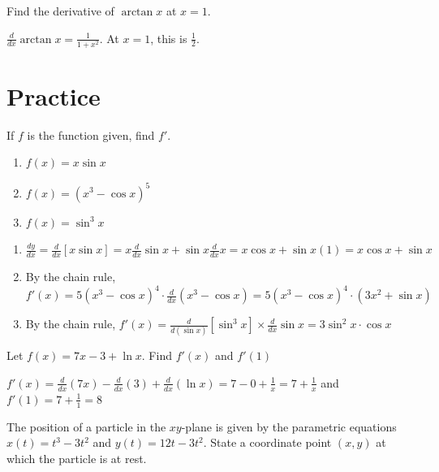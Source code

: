 \begin{Exercise}[title={Derivative of Arctangent}, label=itrig_deriv1]
Find the derivative of $\arctan x$ at $x = 1$.
\end{Exercise}
\begin{Answer}[ref=itrig_deriv1]
$\frac{d}{dx}\arctan x = \frac{1}{1 + x^2}$. At $x = 1$, this is $\frac{1}{2}$.
\end{Answer}

\section{Practice}
\begin{Exercise}[label=deriv_rules1]
If $f$ is the function given, find $f'$. 
	\begin{enumerate}
		\item$f(x) = x\sin{x}$
		\item$f(x)=(x^3-\cos{x})^5$
		\item$f(x) =\sin^3{x}$
	\end{enumerate}
\end{Exercise}

\begin{Answer}[ref=deriv_rules1]
	\begin{enumerate}
		\item $\frac{dy}{dx} = \frac{d}{dx}[x\sin{x}] = x\frac{d}{dx}\sin{x} 
		+ \sin{x}\frac{d}{dx}x = x\cos{x} + \sin{x}(1) = x\cos{x} + \sin{x}$
    	\item By the chain rule, $f'(x) = 5(x^3 - \cos{x})^4 \cdot 
    	\frac{d}{dx}(x^3 - \cos{x}) = 5(x^3 - \cos{x})^4 \cdot (3x^2 + 
    	\sin{x})$
    	\item By the chain rule, $f'(x) = \frac{d}{d(\sin{x})}[\sin^3{x}] 
    	\times \frac{d}{dx}\sin{x} = 3\sin^2{x} \cdot \cos{x}$
	\end{enumerate}
    
\end{Answer}

\begin{Exercise}[label=deriv_rules2]
    Let $f(x)=7x-3+\ln{x}$. Find $f'(x)$ and $f'(1)$
\end{Exercise}
\begin{Answer}[ref=deriv_rules2]
    $f'(x) = \frac{d}{dx}(7x) - \frac{d}{dx}(3) + \frac{d}{dx}(\ln{x})
    = 7 - 0 + \frac{1}{x} = 7 + \frac{1}{x}$
    and
    $f'(1) = 7 + \frac{1}{1} = 8$
\end{Answer}
	
\begin{Exercise} The position 
	of a particle in the $xy$-plane is given by the parametric equations 
	$x(t) = t^3-3t^2$ and $y(t) = 12t-3t^2$. State a coordinate point 
	$(x,y)$ at which the particle is at rest. 
\end{Exercise}
	
